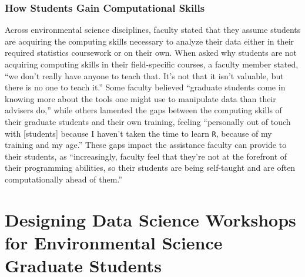 \documentclass[12pt]{article}
\begin{document}
\subsubsection{How Students Gain Computational Skills}

\noindent Across environmental science disciplines, faculty stated that they 
assume students are acquiring the computing skills necessary to analyze their 
data either in their required statistics coursework or on their own. When asked
why students are not acquiring computing skills in their field-specific courses,
a faculty member stated, ``we don't really have anyone to teach that. It's not
that it isn't valuable, but there is no one to teach it.'' Some faculty believed
``graduate students come in knowing more about the tools one might use to
manipulate data than their advisers do,'' while others lamented the gaps between
the computing skills of their graduate students and their own training,
feeling ``personally out of touch with [students] because I haven't taken the
time to learn \texttt{R}, because of my training and my age.'' These gaps impact
the assistance faculty can provide to their students, as ``increasingly, faculty
feel that they're not at the forefront of their programming abilities, so their
students are being self-taught and are often computationally ahead of them.''


\section{Designing Data Science Workshops for Environmental Science Graduate
Students}
\label{sec:workshops}
\end{document}
